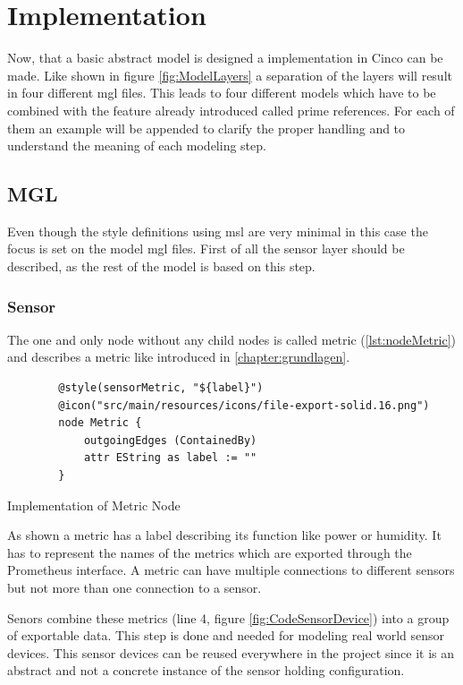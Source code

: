 \chapter{Implementation}
\label{chapter:realisierung}
Now, that a basic abstract model is designed a implementation in Cinco can be made. Like shown in figure \ref{fig:ModelLayers} a separation of the layers will result in four different \gls{mgl} files. This leads to four different models which have to be combined with the feature already introduced called prime references. For each of them an example will be appended to clarify the proper handling and to understand the meaning of each modeling step.

\section{MGL}
\label{sec:mgl}
Even though the style definitions using \gls{msl} are very minimal in this case the focus is set on the model \gls{mgl} files.
First of all the sensor layer should be described, as the rest of the model is based on this step.
\subsection{Sensor}
The one and only node without any child nodes is called metric (\cref{lst:nodeMetric}) and describes a metric like introduced in \cref{chapter:grundlagen}. 
\begin{listing}[H]
	\begin{verbatim}
		@style(sensorMetric, "${label}")
		@icon("src/main/resources/icons/file-export-solid.16.png")
		node Metric {
			outgoingEdges (ContainedBy)
			attr EString as label := ""
		}
	\end{verbatim}
	\caption{Implementation of Metric Node}
	\label{lst:nodeMetric}
\end{listing}
As shown a metric has a label describing its function like power or humidity. It has to represent the names of the metrics which are exported through the Prometheus interface. A metric can have multiple connections to different sensors but not more than one connection to a sensor.

Senors combine these metrics (line 4, figure \ref{fig:CodeSensorDevice}) into a group of exportable data. This step is done and needed for modeling real world sensor devices. This sensor devices can be reused everywhere in the project since it is an abstract and not a concrete instance of the sensor holding configuration. 


